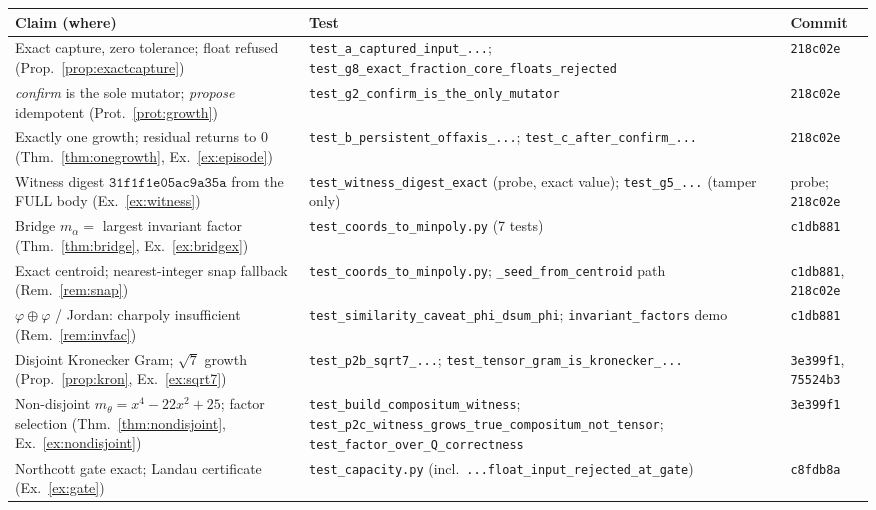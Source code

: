 \documentclass[11pt]{article}
\theoremstyle{plain}
\theoremstyle{definition}
\theoremstyle{remark}
\begin{document}
\begin{table}[ht]
\centering
\footnotesize
\begin{tabular}{p{} p{} l}
\toprule
Claim (where) & Test & Commit \\
\midrule
Exact capture, zero tolerance; float refused (Prop.~\ref{prop:exactcapture}) & \texttt{test\_a\_captured\_input\_...}; \texttt{test\_g8\_exact\_fraction\_core\_floats\_rejected} & \texttt{218c02e} \\
\emph{confirm} is the sole mutator; \emph{propose} idempotent (Prot.~\ref{prot:growth}) & \texttt{test\_g2\_confirm\_is\_the\_only\_mutator} & \texttt{218c02e} \\
Exactly one growth; residual returns to $0$ (Thm.~\ref{thm:onegrowth}, Ex.~\ref{ex:episode}) & \texttt{test\_b\_persistent\_offaxis\_...}; \texttt{test\_c\_after\_confirm\_...} & \texttt{218c02e} \\
Witness digest $\texttt{31f1f1e05ac9a35a}$ from the FULL body (Ex.~\ref{ex:witness}) & \texttt{test\_witness\_digest\_exact} (probe, exact value); \texttt{test\_g5\_...} (tamper only) & probe; \texttt{218c02e} \\
Bridge $m_\alpha=$ largest invariant factor (Thm.~\ref{thm:bridge}, Ex.~\ref{ex:bridgex}) & \texttt{test\_coords\_to\_minpoly.py} (7 tests) & \texttt{c1db881} \\
Exact centroid; nearest-integer snap fallback (Rem.~\ref{rem:snap}) & \texttt{test\_coords\_to\_minpoly.py}; \texttt{\_seed\_from\_centroid} path & \texttt{c1db881}, \texttt{218c02e} \\
$\varphi\!\oplus\!\varphi$ / Jordan: charpoly insufficient (Rem.~\ref{rem:invfac}) & \texttt{test\_similarity\_caveat\_phi\_dsum\_phi}; \texttt{invariant\_factors} demo & \texttt{c1db881} \\
Disjoint Kronecker Gram; $\sqrt7$ growth (Prop.~\ref{prop:kron}, Ex.~\ref{ex:sqrt7}) & \texttt{test\_p2b\_sqrt7\_...}; \texttt{test\_tensor\_gram\_is\_kronecker\_...} & \texttt{3e399f1}, \texttt{75524b3} \\
Non-disjoint $m_\theta=x^4{-}22x^2{+}25$; factor selection (Thm.~\ref{thm:nondisjoint}, Ex.~\ref{ex:nondisjoint}) & \texttt{test\_build\_compositum\_witness}; \texttt{test\_p2c\_witness\_grows\_true\_compositum\_not\_tensor}; \texttt{test\_factor\_over\_Q\_correctness} & \texttt{3e399f1} \\
Northcott gate exact; Landau certificate (Ex.~\ref{ex:gate}) & \texttt{test\_capacity.py} (incl.\ \texttt{...float\_input\_rejected\_at\_gate}) & \texttt{c8fdb8a} \\

\end{tabular}
\end{table}
\end{document}
